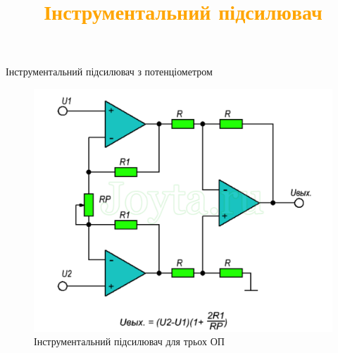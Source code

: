 \documentclass[aspectratio=169]{beamer}
\begin{document}
{
\title{\textcolor{orange}{Інструментальний підсилювач}}
\begin{frame}{Інструментальний підсилювач з потенціометром}

\begin{figure}[!ht]
\begin{center}
\includegraphics[scale=0.33]{bbb.png}
\caption{Інструментальний підсилювач для трьох ОП}
\end{center}
\end{figure}
\end{frame}
}
\end{document}
